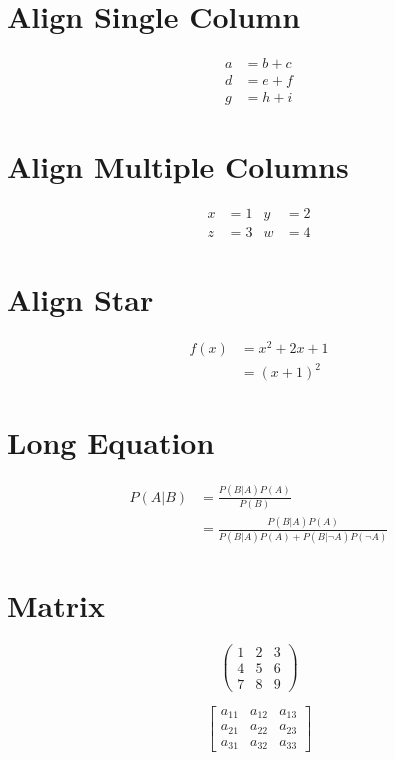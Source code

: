 \documentclass{article}
\begin{document}
\section{Align Single Column}
\begin{align}
  a & = b + c \\
  d & = e + f \\
  g & = h + i
\end{align}

\section{Align Multiple Columns}
\begin{align}
  x & = 1 & y & = 2 \\
  z & = 3 & w & = 4
\end{align}

\section{Align Star}
\begin{align*}
  f(x) & = x^{2} + 2x + 1 \\
       & = (x+1)^{2}
\end{align*}

\section{Long Equation}
\begin{align}
  P(A|B) & = \frac{P(B|A) P(A)}{P(B)} \\
         & = \frac{P(B|A) P(A)}{P(B|A) P(A) + P(B|\neg A) P(\neg A)}
\end{align}

\section{Matrix}
\begin{equation}
  \begin{pmatrix}
    1 & 2 & 3 \\
    4 & 5 & 6 \\
    7 & 8 & 9
  \end{pmatrix}
\end{equation}

\begin{equation}
  \begin{bmatrix}
    a_{11} & a_{12} & a_{13} \\
    a_{21} & a_{22} & a_{23} \\
    a_{31} & a_{32} & a_{33}
  \end{bmatrix}
\end{equation}
\end{document}
